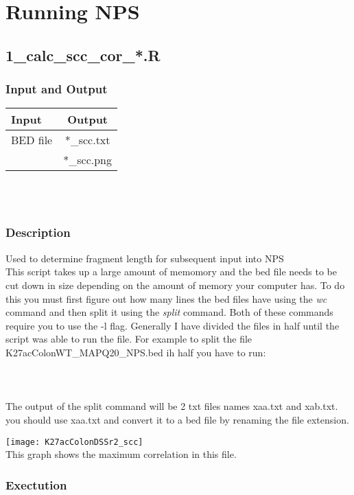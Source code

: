 \documentclass[14pt]{article}
\begin{document}
\section{Running NPS}
\subsection{1\_calc\_scc\_cor\_*.R}
\subsubsection{Input and Output}
\begin{tabular}{l |c }
Input & Output \\
\hline
BED file & *\_scc.txt\\
& *\_scc.png\\
\end{tabular}\\
\\
\subsubsection{Description}
Used to determine fragment length for subsequent input into NPS\\
This script takes up a large amount of memomory and the bed file needs to be cut down in size depending on the amount of memory your computer has. To do this you must first figure out how many lines the bed files have using the \emph{wc} command and then split it using the \emph{split} command. Both of these commands require you to use the -l flag. Generally I have divided the files in half until the script was able to run the file. For example to split the file K27acColonWT\_MAPQ20\_NPS.bed ih half you have to run:\\
\\

\\
\\
The output of the split command will be 2 txt files names xaa.txt and xab.txt. you should use xaa.txt and convert it to a bed file by renaming the file extension.


\texttt{[image: K27acColonDSSr2\_scc]} \\
This graph shows the maximum correlation in this file.
\\
\subsubsection{Exectution}
\\
\end{document}
